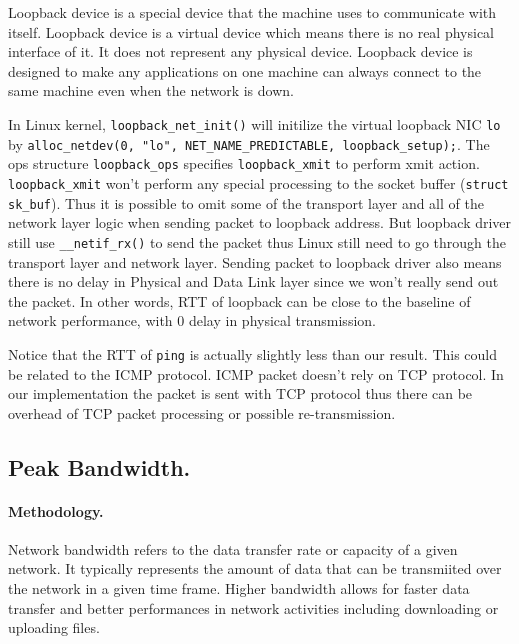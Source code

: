 Loopback device is a special device that the machine uses to communicate with itself. Loopback device is a virtual device which means there is no real physical interface of it. It does not represent any physical device. Loopback device is designed to make any applications on one machine can always connect to the same machine even when the network is down.

In Linux kernel, \texttt{loopback\_net\_init()} will initilize the virtual loopback NIC \texttt{lo} by \texttt{alloc\_netdev(0, "lo", NET\_NAME\_PREDICTABLE, loopback\_setup);}. The ops structure \texttt{loopback\_ops} specifies \texttt{loopback\_xmit} to perform xmit action. \texttt{loopback\_xmit} won't perform any special processing to the socket buffer (\texttt{struct sk\_buf}). Thus it is possible to omit some of the transport layer and all of the network layer logic when sending packet to loopback address. But loopback driver still use \texttt{\_\_netif\_rx()} to send the packet thus Linux still need to go  through the transport layer and network layer. Sending packet to loopback driver also means there is no delay in Physical and Data Link layer since we won't really send out the packet. In other words, RTT of loopback can be close to the baseline of network performance, with 0 delay in physical transmission.

Notice that the RTT of \texttt{ping} is actually slightly less than our result. This could be related to the ICMP protocol. ICMP packet doesn't rely on TCP protocol. In our implementation the packet is sent with TCP protocol thus there can be overhead of TCP packet processing or possible re-transmission.

\subsection{Peak Bandwidth.} 
\paragraph{Methodology.} Network bandwidth refers to the data transfer rate or capacity of a given network. It typically represents the amount of data that can be transmiited over the network in a given time frame. Higher bandwidth allows for faster data transfer and better performances in network activities including downloading or uploading files. 

